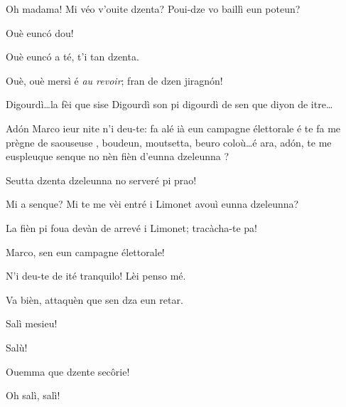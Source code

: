 \begin{drama}
\Dallasspeaks  Oh madama! Mi véo v'ouite dzenta? Poui-dze vo baillì eun poteun?

\Saventaspeaks {} Ouè eunc\'o dou!


\Saventaspeaks {} Ouè eunc\'o a té, t'i tan dzenta.

\Joellespeaks {} Ouè, ouè mersì é \textit{au revoir};  fran de dzen jiragn\'on!


\Saventaspeaks {} Digourdì\ldots la fèi que sise Digourdì son pi digourdì de sen que diyon de itre\ldots


{}


\Cimaspeaks Ad\'on Marco ieur nite n'i deu-te: fa alé ià eun campagne élettorale é te fa me prègne de saouseuse \salan, boudeun, moutsetta, beuro coloù\ldots é ara, ad\'on, te me euspleuque senque no nèn fièn d'eunna dzeleunna \gallina ?

\Marcospeaks {} Seutta dzenta dzeleunna  no serveré pi prao!

\Cimaspeaks  Mi a senque? Mi te me vèi entré i Limonet avouì eunna dzeleunna?

\Marcospeaks La fièn pi foua devàn de arrevé i Limonet; tracàcha-te pa!

\Cimaspeaks Marco, sen eun campagne élettorale!

\Marcospeaks N'i deu-te de ité tranquilo! Lèi penso mé.

\Cimaspeaks  Va bièn, attaquèn que sen dza eun retar.


\Cimaspeaks Salì mesieu!

\Pompiolenspeaks Salù!

\Marcospeaks Ouemma que dzente sec\^orie!

\Pompiolenspeaks Oh salì, salì!


\end{drama}
